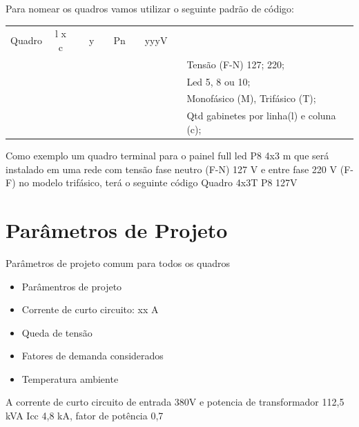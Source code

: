 Para nomear os quadros vamos utilizar o seguinte padrão de código:
\begin{table}[!h]
\begin{tabular}{c  c c l  l l l r l l}
Quadro 		& l x c		& 	 &{y}			& 		&{Pn}			& 			&{yyyV} 	&			&\\

			& 	\vline	& 	  & 	\vline	&		&		\vline	&			&	\vline 		& 	&	Tensão (F-N) 127; 220;  \\
\cline{9-10} 
			& 	\vline	& 	  & 	\vline	&		&		\vline	&			&			&			&	Led 5, 8 ou 10;  \\
\cline{7-10} 
			& 	\vline	& 	  & 	\vline &		&				&			&			&			&	Monofásico (M), Trifásico (T);  \\
\cline{5-10} 
			& 	\vline	& 	  & 			&		&				&			&			&			&	 Qtd gabinetes por linha(l) e coluna (c);  \\
\cline{3-10} 
\end{tabular}
\end{table}
Como exemplo um quadro terminal para o painel full led  P8 4x3 m que será instalado em uma rede com tensão fase neutro (F-N) 127 V e entre fase 220 V (F-F) no modelo trifásico, terá o seguinte código Quadro 4x3T P8 127V
\section{Parâmetros de Projeto}
Parâmetros de projeto comum para todos os quadros
\begin{itemize}
\item Parâmentros de projeto
\item Corrente de curto circuito:  xx A
\item Queda de tensão
\item Fatores de demanda considerados
\item Temperatura ambiente
\end{itemize}
   
   
A corrente de curto circuito de entrada 380V e potencia de transformador 112,5 kVA Icc 4,8 kA, fator de potência 0,7

